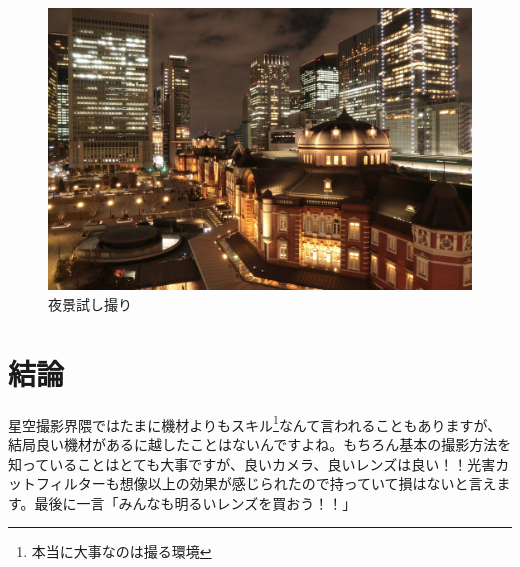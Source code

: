 \documentclass[../../super_nova_2023]{subfiles}
\begin{document}
\begin{figure}[H]
	\begin{center}
		\includegraphics[width=14cm]{figures/Maruyama/tokyo.jpg}
		\caption{夜景試し撮り}
	\end{center}
\end{figure}
\section{\texorpdfstring{結論\footnotemark}{結論}}
星空撮影界隈ではたまに機材よりもスキル\footnote{本当に大事なのは撮る環境}なんて言われることもありますが、結局良い機材があるに越したことはないんですよね。もちろん基本の撮影方法を知っていることはとても大事ですが、良いカメラ、良いレンズは良い！！光害カットフィルターも想像以上の効果が感じられたので持っていて損はないと言えます。最後に一言「みんなも明るいレンズを買おう！！」
\end{document}

